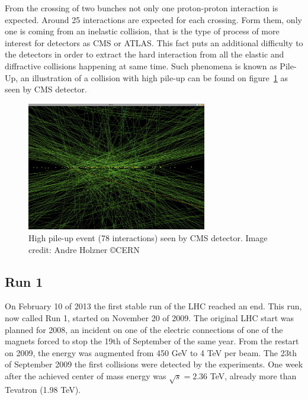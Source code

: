 From the crossing of two bunches not only one proton-proton interaction is expected. Around 25 interactions are expected for each crossing. Form them, only one is coming from an inelastic collision, that is the type of process of more interest for detectors as CMS or ATLAS. This fact puts an additional difficulty to the detectors in order to extract the hard interaction from all the elastic and diffractive collisions happening at same time. Such phenomena is known as Pile-Up, an illustration of a collision with high pile-up can be found on figure~\ref{fig:pileup} as seen by CMS detector.

\begin{figure}[!Hhtbp]
  \begin{center}
    \includegraphics[width=0.7\textwidth]{figs/pileup.png}
    \caption{High pile-up event (78 interactions) seen by CMS detector. Image credit: Andre Holzner \copyright CERN}
    \label{fig:pileup}
  \end{center}
\end{figure}

\subsection{Run 1}
\label{sec:run1}

On February 10 of 2013 the first stable run of the LHC reached an end. This run, now called Run 1, started on November 20 of 2009. The original LHC start was planned for 2008, an incident on one of the electric connections of one of the magnets forced to stop the 19th of September of the same year. From the restart on 2009, the energy was augmented from 450 GeV to 4 TeV per beam. The 23th of September 2009 the first collisions were detected by the experiments. One week after the achieved center of mass energy was $\sqrt{s}=2.36$ TeV, already more than Tevatron (1.98 TeV). 

